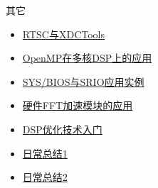 \documentclass[10pt]{ctexbeamer}
\begin{document}
    \begin{frame}{其它}
    \begin{itemize}
        \setlength{\itemsep}{0.3cm}
        \item \href{https://blog.csdn.net/qq_35787848/article/details/124370431}{RTSC与XDCTools}
        \item \href{https://blog.csdn.net/qq_35787848/article/details/124988004}{OpenMP在多核DSP上的应用}
        \item \href{https://blog.csdn.net/qq_35787848/article/details/125274477}{SYS/BIOS与SRIO应用实例}
        \item \href{https://blog.csdn.net/qq_35787848/article/details/127146068}{硬件FFT加速模块的应用}
        \item \href{https://blog.csdn.net/qq_35787848/article/details/127180877}{DSP优化技术入门}
        \item \href{https://blog.csdn.net/qq_35787848/article/details/123386277}{日常总结1}
        \item \href{https://blog.csdn.net/qq_35787848/article/details/127141187}{日常总结2}
    \end{itemize}
    \end{frame}
\end{document}
